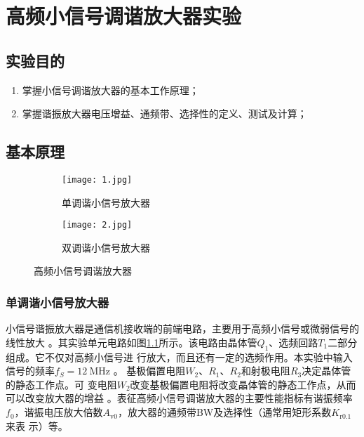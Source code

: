 \documentclass[../main]{subfiles}
\begin{document}
\chapter{高频小信号调谐放大器实验}%
\label{cha:高频小信号调谐放大器实验}

\section{实验目的}%
\label{sec:\arabic{chapter}实验目的}

\begin{enumerate}

	\item 掌握小信号调谐放大器的基本工作原理；

	\item 掌握谐振放大器电压增益、通频带、选择性的定义、测试及计算；

\end{enumerate}

\section{基本原理}%
\label{sec:\arabic{chapter}基本原理}

\begin{figure}[htbp]
	\centering
	\begin{subfigure}[htbp]{.45\linewidth}
		\centering
		\texttt{[image: 1.jpg]}
		\caption{单调谐小信号放大器}
		\label{fig:单调谐小信号放大器}
	\end{subfigure}
	\quad
	\begin{subfigure}[htbp]{.45\linewidth}
		\centering
		\texttt{[image: 2.jpg]}
		\caption{双调谐小信号放大器}
		\label{fig:双调谐小信号放大器}
	\end{subfigure}
	\caption{高频小信号调谐放大器}
	\label{fig:高频小信号调谐放大器}
\end{figure}

\subsection{单调谐小信号放大器}%
\label{sub:单调谐小信号放大器}

小信号谐振放大器是通信机接收端的前端电路，主要用于高频小信号或微弱信号的线性放大
。其实验单元电路如图\ref{fig:单调谐小信号放大器}所示。该电路由晶体管$ Q_1 $、选频回路$ T_1 $二部分组成。它不仅对高频小信号进
行放大，而且还有一定的选频作用。本实验中输入信号的频率$ f_S = \SI{12}{\MHz} $ 。
基极偏置电阻$ W_2 $、$ R_1 $、$ R_2 $和射极电阻$ R_3 $决定晶体管的静态工作点。可
变电阻$ W_2 $改变基极偏置电阻将改变晶体管的静态工作点，从而可以改变放大器的增益
。表征高频小信号调谐放大器的主要性能指标有谐振频率$ f_0 $，谐振电压放大倍数$
A_\mathrm{v0} $，放大器的通频带BW及选择性（通常用矩形系数$ K_\mathrm{r0.1} $来表
示）等。
\end{document}
